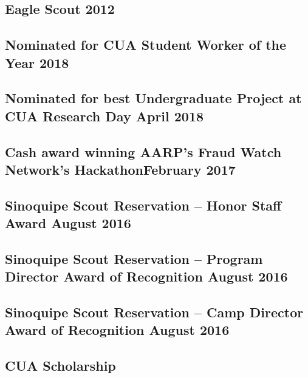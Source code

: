 \documentclass{article}
\begin{document}
\subsection{Eagle Scout \hfill 2012}
\subsection{Nominated for CUA Student Worker of the Year \hfill 2018}
\subsection{Nominated for best Undergraduate Project at CUA Research Day \hfill April 2018}
\subsection{Cash award winning AARP's Fraud Watch Network's Hackathon\hfill February 2017}
\subsection{Sinoquipe Scout Reservation -- Honor Staff Award \hfill August 2016}
\subsection{Sinoquipe Scout Reservation -- Program Director Award of Recognition \hfill August 2016}
\subsection{Sinoquipe Scout Reservation -- Camp Director Award of Recognition \hfill August 2016}
\subsection{CUA Scholarship }
\end{document}
